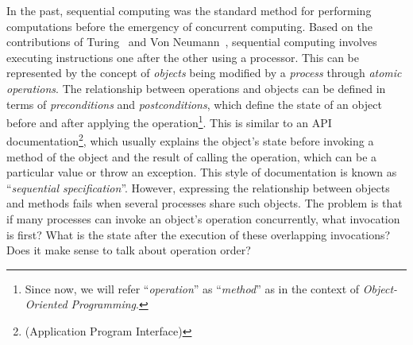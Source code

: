 In the past, sequential computing was the standard method for performing computations before the emergency of concurrent computing. Based on the contributions of  Turing~\cite{DBLP_journals_x_Turing37} and Von Neumann~\cite{DBLP_journals_annals_Neumann93}, sequential computing involves executing instructions one after the other using a processor. This can be represented by the concept of \textit{objects} being modified by a \textit{process} through \textit{atomic operations}. The relationship between operations and objects can be defined in terms of \textit{preconditions} and \textit{postconditions}, which define the state of an object before and after applying the operation\footnote{Since now, we will refer ``\textit{operation}'' as ``\textit{method}'' as in the context of \textit{Object-Oriented Programming}.}. This is similar to an API documentation\footnote{(Application Program Interface)}, which usually explains the object's state before invoking a method of the object and the result of calling the operation, which can be a particular value or throw an exception. This style of documentation is known as ``\textit{sequential specification}''.
However, expressing the relationship between objects and methods fails when several processes share such objects. The problem is that if many processes can invoke an object's operation concurrently, what invocation is first? What is the state after the execution of these overlapping invocations? Does it make sense to talk about operation order?

